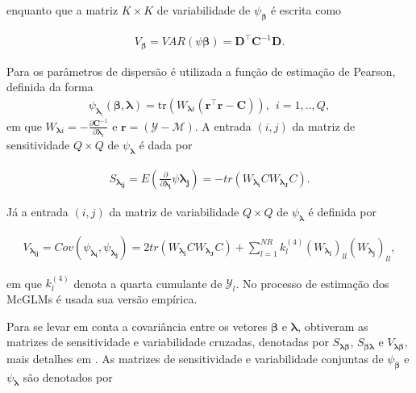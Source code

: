 \noindent enquanto que a matriz $K \times K$ de variabilidade de $\psi_{\boldsymbol{\beta}}$ é escrita como

$$
\begin{aligned}
V_{\boldsymbol{\beta}} = VAR(\psi \boldsymbol{\beta}) = \boldsymbol{D}^{\top} \boldsymbol{C}^{-1} \boldsymbol{D}.
\end{aligned}
$$

Para os parâmetros de dispersão é utilizada a função de estimação de
Pearson, definida da forma
    \begin{equation}
    \label{eq:pearson}
      \begin{aligned}
        \psi_{\boldsymbol{\lambda}_i}(\boldsymbol{\beta},
        \boldsymbol{\lambda}) =
        \mathrm{tr}(W_{\boldsymbol{\lambda}i}
          (\boldsymbol{r}^\top\boldsymbol{r} -
          \boldsymbol{C})), \: \: i = 1,.., Q, 
    \end{aligned}
\end{equation}
\noindent em que $W_{\boldsymbol{\lambda}i} = -\frac{\partial
    \boldsymbol{C}^{-1}}{\partial \boldsymbol{\lambda}_i}$ e
    $\boldsymbol{r} = (\mathcal{Y} - \mathcal{M})$. A entrada $(i,j)$ da matriz de sensitividade $Q \times Q$ de $\psi_{\boldsymbol{\lambda}}$ é
dada por

$$
      \begin{aligned}
S_{\boldsymbol{\lambda_{ij}}} = E \left (\frac{\partial }{\partial \boldsymbol{\lambda_{i}}} \psi \boldsymbol{\lambda_{j}}\right) = -tr(W_{\boldsymbol{\lambda_{i}}} CW_{\boldsymbol{\lambda_{J}}} C).
    \end{aligned}
$$

\noindent Já a entrada $(i,j)$ da matriz de variabilidade $Q \times Q$ de $\psi_{\boldsymbol{\lambda}}$ é definida por

$$
      \begin{aligned}
V_{\boldsymbol{\lambda_{ij}}} = Cov\left ( \psi_{\boldsymbol{\lambda_{i}}}, \psi_{\boldsymbol{\lambda_{j}}} \right) = 2tr(W_{\boldsymbol{\lambda_{i}}} CW_{\boldsymbol{\lambda_{J}}} C) + \sum_{l=1}^{NR} k_{l}^{(4)} (W_{\boldsymbol{\lambda_{i}}})_{ll} (W_{\boldsymbol{\lambda_{j}}})_{ll},
    \end{aligned}
$$

\noindent em que $k_{l}^{(4)}$ denota a quarta cumulante de $\mathcal{Y}_{l}$. No processo de estimação dos McGLMs é usada sua versão empírica.

Para se levar em conta a covariância entre os vetores $\boldsymbol{\beta}$
e $\boldsymbol{\lambda}$, \citet{Bonat16} obtiveram as matrizes de 
sensitividade e variabilidade cruzadas, denotadas por $S_{\boldsymbol{\lambda \beta}}$, $S_{\boldsymbol{\beta \lambda}}$ e $V_{\boldsymbol{\lambda \beta}}$, mais detalhes em \citet{Bonat16}. As matrizes de sensitividade e variabilidade conjuntas de $\psi_{\boldsymbol{\beta}}$ e $\psi_{\boldsymbol{\lambda}}$ são denotados por

